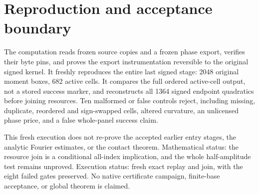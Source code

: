 \documentclass[11pt]{article}
\begin{document}
\section{Reproduction and acceptance boundary}
The computation reads frozen source copies and a frozen phase export,
verifies their byte pins, and proves the export instrumentation reversible
to the original signed kernel. It freshly reproduces the entire last
signed stage: 2048 original moment boxes, 682 active cells. It compares
the full ordered active-cell output, not a stored success marker, and
reconstructs all 1364 signed endpoint quadratics before joining resources.
Ten malformed or false controls reject, including missing, duplicate,
reordered and sign-swapped cells, altered curvature, an unlicensed phase
price, and a false whole-panel success claim.

This fresh execution does not re-prove the accepted earlier entry stages,
the analytic Fourier estimates, or the contact theorem. Mathematical
status: the resource join is a conditional all-index implication, and
the whole half-amplitude test remains unproved. Execution status: fresh
exact replay and join, with the eight failed gates preserved. No native
certificate campaign, finite-base acceptance, or global theorem is claimed.
\end{document}
